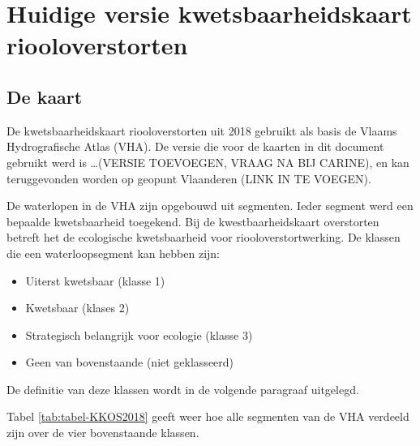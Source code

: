 \documentclass[twoside]{extreport}
\begin{document}
\chapter{Huidige versie kwetsbaarheidskaart
riooloverstorten}\label{huidige-versie-kwetsbaarheidskaart-riooloverstorten}

\section{De kaart}\label{de-kaart}

De kwetsbaarheidskaart riooloverstorten uit 2018 gebruikt als basis de
Vlaams Hydrografische Atlas (VHA). De versie die voor de kaarten in dit
document gebruikt werd is \ldots(VERSIE TOEVOEGEN, VRAAG NA BIJ CARINE),
en kan teruggevonden worden op geopunt Vlaanderen (LINK IN TE VOEGEN).

De waterlopen in de VHA zijn opgebouwd uit segmenten. Ieder segment werd
een bepaalde kwetsbaarheid toegekend. Bij de kwestbaarheidskaart
overstorten betreft het de ecologische kwetsbaarheid voor
riooloverstortwerking. De klassen die een waterloopsegment kan hebben
zijn:

\begin{itemize}
\tightlist
\item
  Uiterst kwetsbaar (klasse 1)
\item
  Kwetsbaar (klases 2)
\item
  Strategisch belangrijk voor ecologie (klasse 3)
\item
  Geen van bovenstaande (niet geklasseerd)
\end{itemize}

De definitie van deze klassen wordt in de volgende paragraaf uitgelegd.

Tabel \ref{tab:tabel-KKOS2018} geeft weer hoe alle segmenten van de VHA
verdeeld zijn over de vier bovenstaande klassen.
\end{document}
